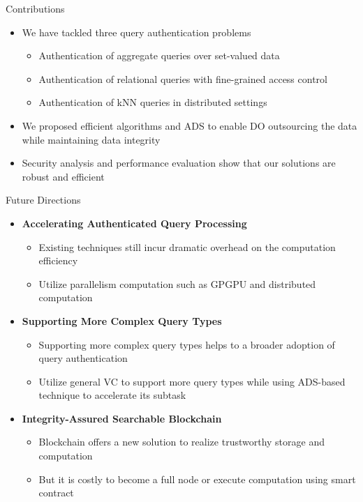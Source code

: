 \documentclass[xcolor={dvipsnames},aspectratio=169,10pt]{beamer}
\begin{document}
\begin{frame}{Contributions}
  \begin{itemize}
    \item We have tackled three query authentication problems
      \begin{itemize}
        \item Authentication of aggregate queries over set-valued data
        \item Authentication of relational queries with fine-grained access control
        \item Authentication of kNN queries in distributed settings
      \end{itemize}
    \item We proposed efficient algorithms and ADS to enable DO outsourcing the data while maintaining data integrity
    \item Security analysis and performance evaluation show that our solutions are robust and efficient
  \end{itemize}
\end{frame}

\begin{frame}{Future Directions}
  \begin{itemize}[<+->]
    \item \textbf{Accelerating Authenticated Query Processing}
      \begin{itemize}[<1->]
        \item Existing techniques still incur dramatic overhead on the computation efficiency
        \item Utilize parallelism computation such as GPGPU and distributed computation
      \end{itemize}
    \item \textbf{Supporting More Complex Query Types}
      \begin{itemize}[<1->]
        \item Supporting more complex query types helps to a broader adoption of query authentication
        \item Utilize general VC to support more query types while using ADS-based technique to accelerate its subtask
      \end{itemize}
    \item \textbf{Integrity-Assured Searchable Blockchain}
      \begin{itemize}[<1->]
        \item Blockchain offers a new solution to realize trustworthy storage and computation
        \item But it is costly to become a full node or execute computation using smart contract
      \end{itemize}
  \end{itemize}
\end{frame}
\end{document}
